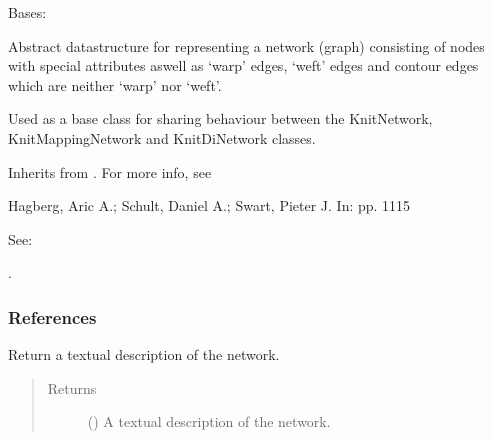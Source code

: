 \documentclass[letterpaper,10pt,english]{sphinxmanual}
\begin{document}
\begin{fulllineitems}
\label{\detokenize{cockatoo:cockatoo.KnitNetworkBase}}
Bases: 

Abstract datastructure for representing a network (graph) consisting of
nodes with special attributes aswell as ‘warp’ edges, ‘weft’ edges and
contour edges which are neither ‘warp’ nor ‘weft’.

Used as a base class for sharing behaviour between the KnitNetwork,
KnitMappingNetwork and KnitDiNetwork classes.

Inherits from .
For more info, see  %
\begin{footnote}[13]\sphinxAtStartFootnote
Hagberg, Aric A.; Schult, Daniel A.; Swart, Pieter J.
 In:  pp. 11\sphinxhyphen{}15

See: \sphinxfootnotemark[69]
%
\end{footnote}%
\begin{footnotetext}[69]\sphinxAtStartFootnote
{}
%
\end{footnotetext}\ignorespaces .
\subsubsection*{References}

\begin{fulllineitems}
\label{\detokenize{cockatoo:cockatoo.KnitNetworkBase.ToString}}
Return a textual description of the network.
\begin{quote}\begin{description}
\item[{Returns}] \leavevmode
{} () \textendash{} A textual description of the network.


\end{description}
\end{quote}
\end{fulllineitems}
\end{fulllineitems}
\end{document}
